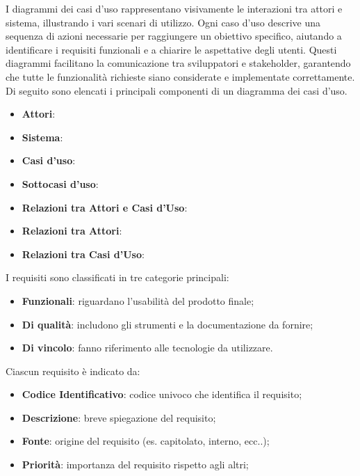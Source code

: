 I diagrammi dei casi d’uso rappresentano visivamente le interazioni tra attori e sistema,
illustrando i vari scenari di utilizzo. Ogni caso d’uso descrive una sequenza di 
azioni necessarie per raggiungere un obiettivo specifico, aiutando a identificare i 
requisiti funzionali e a chiarire le aspettative degli utenti. Questi diagrammi 
facilitano la comunicazione tra sviluppatori e stakeholder, garantendo che tutte le 
funzionalità richieste siano considerate e implementate correttamente. 
Di seguito sono elencati i principali componenti di un diagramma dei casi d’uso.

\begin{itemize}
    \item \textbf{Attori}: 
    \item \textbf{Sistema}: 
    \item \textbf{Casi d’uso}:
    \item \textbf{Sottocasi d’uso}: 
    \item \textbf{Relazioni tra Attori e Casi d’Uso}:
    \item \textbf{Relazioni tra Attori}:
    \item \textbf{Relazioni tra Casi d’Uso}:
\end{itemize}


I requisiti sono classificati in tre categorie principali:  
\begin{itemize}
    \item \textbf{Funzionali}: riguardano l'usabilità del prodotto finale;  
    \item \textbf{Di qualità}: includono gli strumenti e la documentazione da fornire;  
    \item \textbf{Di vincolo}: fanno riferimento alle tecnologie da utilizzare.
\end{itemize}
Ciascun requisito è indicato da:
\begin{itemize}
    \item \textbf{Codice Identificativo}: codice univoco che identifica il requisito;
    \item \textbf{Descrizione}: breve spiegazione del requisito;
    \item \textbf{Fonte}: origine del requisito (es. capitolato, interno, ecc..);
    \item \textbf{Priorità}: importanza del requisito rispetto agli altri;
\end{itemize} 

